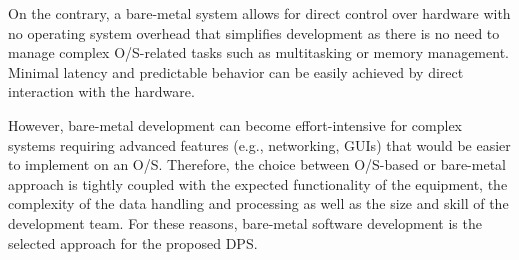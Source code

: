 On the contrary, a bare-metal system allows for direct control over hardware
with no operating system overhead that simplifies development
as there is no need to manage complex \acs{O/S}-related tasks such as
multitasking or memory management.
Minimal latency and predictable behavior can be easily achieved by direct
interaction with the hardware.

However, bare-metal development can become effort-intensive for complex systems
requiring advanced features (e.g., networking, GUIs) that would be easier to
implement on an \acs{O/S}.
Therefore, the choice between \acs{O/S}-based or bare-metal approach is tightly
coupled with the expected functionality of the equipment, the complexity of
the data handling and processing as well as the size and skill of
the development team.
For these reasons, bare-metal software development is the selected approach
for the proposed \acs{DPS}.